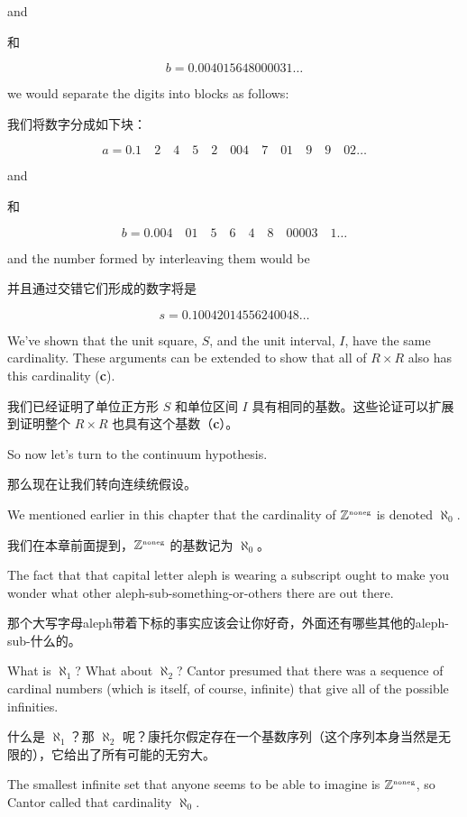 \noindent and

\noindent 和

\[ b = 0.004015648000031 \ldots \]

\noindent we would separate the digits into blocks as follows:

\noindent 我们将数字分成如下块：

\[ a = 0.1 \quad 2 \quad 4 \quad 5\quad 2 \quad 004\quad 7\quad 01\quad 9 \quad 9 \quad 02 \ldots \]

\noindent and

\noindent 和

\[ b = 0.004 \quad 01 \quad  5 \quad  6 \quad  4 \quad  8 \quad  00003 \quad  1 \ldots \]

\noindent and the number formed by interleaving them would be

\noindent 并且通过交错它们形成的数字将是

\[ s = 0.10042014556240048 \ldots \]

We've shown that the unit square, $S$, and the unit interval, $I$, have
the
same cardinality.  These arguments can be extended to show that all of $R \times R$ also has this cardinality ({\bf c}).

我们已经证明了单位正方形 $S$ 和单位区间 $I$ 具有相同的基数。这些论证可以扩展到证明整个 $R \times R$ 也具有这个基数（{\bf c}）。

So now let's turn to the continuum hypothesis.

那么现在让我们转向连续统假设。

We mentioned earlier in this chapter that the cardinality of ${\mathbb Z}^{\mbox{\tiny noneg}}$ is
denoted $\aleph_0$.

我们在本章前面提到，${\mathbb Z}^{\mbox{\tiny noneg}}$ 的基数记为 $\aleph_0$。

The fact that that capital letter aleph is wearing a
subscript ought to make you wonder what other aleph-sub-something-or-others
there are out there.

那个大写字母aleph带着下标的事实应该会让你好奇，外面还有哪些其他的aleph-sub-什么的。

What is $\aleph_1$?  What about $\aleph_2$?  Cantor
presumed that there was a sequence of cardinal numbers (which is itself, of course, infinite) that give all of the possible infinities.

什么是 $\aleph_1$？那 $\aleph_2$ 呢？康托尔假定存在一个基数序列（这个序列本身当然是无限的），它给出了所有可能的无穷大。

The smallest infinite set that anyone seems to be able to imagine is ${\mathbb Z}^{\mbox{\tiny noneg}}$, so Cantor called
that cardinality $\aleph_0$.

